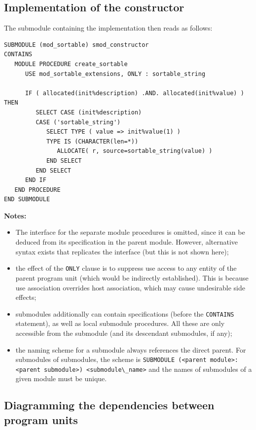 \documentclass[
  paper=a4,
  ,captions=tableheading
]{scrartcl}
\newcommand{\passthrough}[1]{#1}
\providecommand{\tightlist}{%
  \setlength{\itemsep}{0pt}\setlength{\parskip}{0pt}}
\begin{document}
\subsection{Implementation of the
constructor}\label{implementation-of-the-constructor}

The submodule containing the implementation then reads as follows:

\begin{lstlisting}
SUBMODULE (mod_sortable) smod_constructor
CONTAINS
   MODULE PROCEDURE create_sortable
      USE mod_sortable_extensions, ONLY : sortable_string

      IF ( allocated(init%description) .AND. allocated(init%value) ) THEN
         SELECT CASE (init%description)
         CASE ('sortable_string')
            SELECT TYPE ( value => init%value(1) )
            TYPE IS (CHARACTER(len=*))
               ALLOCATE( r, source=sortable_string(value) )
            END SELECT
         END SELECT
      END IF
   END PROCEDURE
END SUBMODULE
\end{lstlisting}

\textbf{Notes:}

\begin{itemize}
\tightlist
\item
  The interface for the separate module procedures is omitted, since it
  can be deduced from its specification in the parent module. However,
  alternative syntax exists that replicates the interface (but this is
  not shown here);
\item
  the effect of the \passthrough{\lstinline!ONLY!} clause is to suppress
  use access to any entity of the parent program unit (which would be
  indirectly established). This is because use association overrides
  host association, which may cause undesirable side effects;
\item
  submodules additionally can contain specifications (before the
  \passthrough{\lstinline!CONTAINS!} statement), as well as local
  submodule procedures. All these are only accessible from the submodule
  (and its descendant submodules, if any);
\item
  the naming scheme for a submodule always references the direct parent.
  For submodules of submodules, the scheme is
  \passthrough{\lstinline!SUBMODULE (<parent module>:<parent submodule>) <submodule\_name>!}
  and the names of submodules of a given module must be unique.
\end{itemize}

\subsection{Diagramming the dependencies between program
units}\label{diagramming-the-dependencies-between-program-units}
\end{document}
